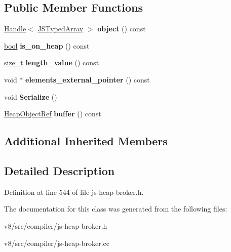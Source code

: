 \subsection*{Public Member Functions}
\begin{DoxyCompactItemize}
\item 
\mbox{\label{classv8_1_1internal_1_1compiler_1_1JSTypedArrayRef_abf561dd3836316945ee62fa728cc731f}} 
\mbox{\hyperlink{classv8_1_1internal_1_1Handle}{Handle}}$<$ \mbox{\hyperlink{classv8_1_1internal_1_1JSTypedArray}{J\+S\+Typed\+Array}} $>$ {\bfseries object} () const
\item 
\mbox{\label{classv8_1_1internal_1_1compiler_1_1JSTypedArrayRef_af62500f8d49d6416733c55258f2e900e}} 
\mbox{\hyperlink{classbool}{bool}} {\bfseries is\+\_\+on\+\_\+heap} () const
\item 
\mbox{\label{classv8_1_1internal_1_1compiler_1_1JSTypedArrayRef_a745ce4211742d26043b34b07511c5d3e}} 
\mbox{\hyperlink{classsize__t}{size\+\_\+t}} {\bfseries length\+\_\+value} () const
\item 
\mbox{\label{classv8_1_1internal_1_1compiler_1_1JSTypedArrayRef_a9d24e07aebdf8d14757a3fe32073f9a3}} 
void $\ast$ {\bfseries elements\+\_\+external\+\_\+pointer} () const
\item 
\mbox{\label{classv8_1_1internal_1_1compiler_1_1JSTypedArrayRef_a4bf59f9abc4615abbbaab587972925c6}} 
void {\bfseries Serialize} ()
\item 
\mbox{\label{classv8_1_1internal_1_1compiler_1_1JSTypedArrayRef_a8360e2299c2c4faeffeda4f344c93e64}} 
\mbox{\hyperlink{classv8_1_1internal_1_1compiler_1_1HeapObjectRef}{Heap\+Object\+Ref}} {\bfseries buffer} () const
\end{DoxyCompactItemize}
\subsection*{Additional Inherited Members}


\subsection{Detailed Description}


Definition at line 544 of file js-\/heap-\/broker.\+h.



The documentation for this class was generated from the following files\+:\begin{DoxyCompactItemize}
\item 
v8/src/compiler/js-\/heap-\/broker.\+h\item 
v8/src/compiler/js-\/heap-\/broker.\+cc\end{DoxyCompactItemize}
